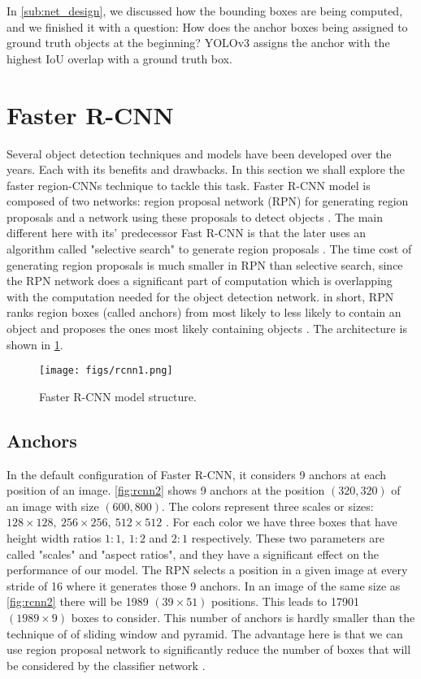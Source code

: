 In \cref{sub:net_design}, we discussed how the bounding boxes are being computed, and we finished it with a question: How does the anchor boxes being
assigned to ground truth objects at the beginning? YOLOv3 assigns the anchor with the highest IoU overlap with a ground
truth box.

\section{Faster R-CNN}
Several object detection techniques and models have been developed over the years. Each with its benefits and drawbacks. In this section we shall explore the faster region-CNNs technique to tackle this task.
Faster R-CNN model is composed of two networks: region proposal network (RPN) for generating region proposals and a network using these proposals to detect objects \cite{b1}. The main different here with its' predecessor Fast R-CNN is that the later uses an algorithm called "selective search" to generate region proposals \cite{b6}. The time cost of generating region proposals is much smaller in RPN than selective search, since the RPN network does a significant part of computation which is overlapping  with the computation needed for the  object detection network. in short, RPN ranks region boxes (called anchors) from most likely to less likely to contain an object and proposes the ones most likely containing objects \cite{b1}. The architecture is  shown in  \cref{fig:rcnn1}.

\begin{figure}[!htpb]
	\centering
	\texttt{[image: figs/rcnn1.png]}
	\caption{Faster R-CNN model structure.}\label{fig:rcnn1}
\end{figure}

\subsection{Anchors}
In the default configuration of Faster R-CNN, it considers 9 anchors at each position of an image. \cref{fig:rcnn2} shows 9 anchors at the position $(320, 320)$ of an image with size $(600, 800)$. The colors represent three scales or sizes: $128 \times 128,\ 256 \times 256,\ 512 \times 512$ . For each color we have three boxes that have height width ratios $1:1,\ 1:2$ and $2:1$ respectively. These two parameters are called "scales" and "aspect ratios", and they have a significant effect on the performance of our model.
The RPN selects a position in a given image at every stride of 16 where it generates those 9 anchors. In an image of the same size as \cref{fig:rcnn2}  there will be 1989 $(39 \times 51)$ positions. This leads to 17901 $(1989 \times 9)$ boxes to consider. This number of anchors is hardly smaller than the technique of of sliding window and pyramid. The advantage here is that we can use region proposal network to significantly reduce the number of boxes that will be considered by the classifier network \cite{b1}.

